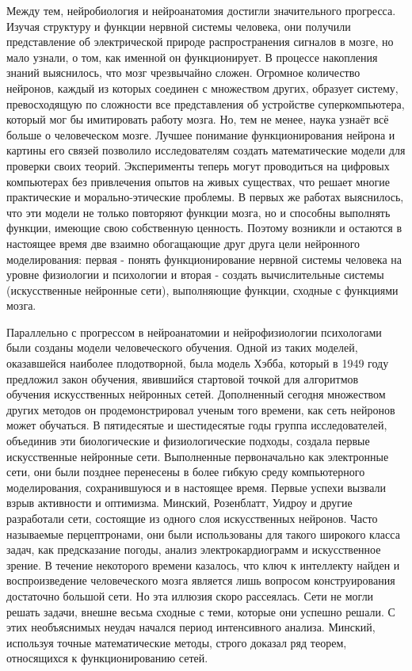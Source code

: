 \documentclass[a4paper,12pt]{report}
\begin{document}
Между тем, нейробиология и нейроанатомия достигли значительного прогресса. Изучая структуру и функции нервной системы человека, они получили представление об электрической природе распространения сигналов в мозге, но мало узнали, о том, как именной он функционирует. В процессе накопления знаний выяснилось, что мозг чрезвычайно сложен. Огромное количество нейронов, каждый из которых соединен с множеством других, образует систему, превосходящую по сложности все представления об устройстве суперкомпьютера, который мог бы имитировать работу мозга. Но, тем не менее, наука узнаёт всё больше о человеческом мозге. Лучшее понимание функционирования нейрона и картины его связей позволило исследователям создать математические модели для проверки своих теорий. Эксперименты теперь могут проводиться на цифровых компьютерах без привлечения опытов на живых существах, что решает многие практические и морально-этические проблемы. В первых же работах выяснилось, что эти модели не только повторяют функции мозга, но и способны выполнять функции, имеющие свою собственную ценность. Поэтому возникли и остаются в настоящее время две взаимно обогащающие друг друга цели нейронного моделирования: первая - понять функционирование нервной системы человека на уровне физиологии и психологии и вторая - создать вычислительные системы (искусственные нейронные сети), выполняющие функции, сходные с функциями мозга. 

Параллельно с прогрессом в нейроанатомии и нейрофизиологии психологами были созданы модели человеческого обучения. Одной из таких моделей, оказавшейся наиболее плодотворной, была модель Хэбба, который в 1949 году предложил закон обучения, явившийся стартовой точкой для алгоритмов обучения искусственных нейронных сетей. Дополненный сегодня множеством других методов он продемонстрировал ученым того времени, как сеть нейронов может обучаться. В пятидесятые и шестидесятые годы группа исследователей, объединив эти биологические и физиологические подходы, создала первые искусственные нейронные сети. Выполненные первоначально как электронные сети, они были позднее перенесены в более гибкую среду компьютерного моделирования, сохранившуюся и в настоящее время. Первые успехи вызвали взрыв активности и оптимизма. Минский, Розенблатт, Уидроу и другие разработали сети, состоящие из одного слоя искусственных нейронов. Часто называемые перцептронами, они были использованы для такого широкого класса задач, как предсказание погоды, анализ электрокардиограмм и искусственное зрение. В течение некоторого времени казалось, что ключ к интеллекту найден и воспроизведение человеческого мозга является лишь вопросом конструирования достаточно большой сети. Но эта иллюзия скоро рассеялась. Сети не могли решать задачи, внешне весьма сходные с теми, которые они успешно решали. С этих необъяснимых неудач начался период интенсивного анализа. Минский, используя точные математические методы, строго доказал ряд теорем, относящихся к функционированию сетей.
\end{document}
